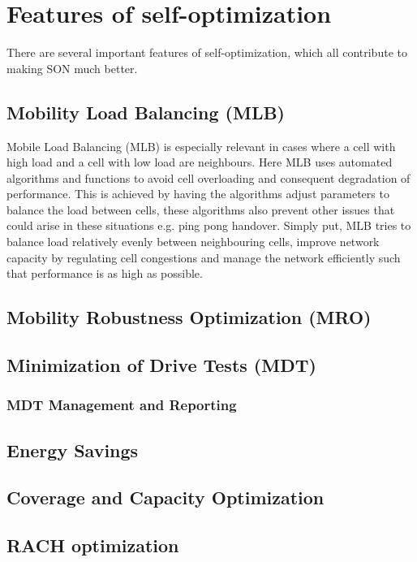 \documentclass{report}
\begin{document}
\section{Features of self-optimization}
There are several important features of self-optimization, which all contribute to making SON much better. 

\subsection{Mobility Load Balancing (MLB)}
Mobile Load Balancing (MLB) is especially relevant in cases where a cell with high load and a cell with low load are neighbours. Here MLB uses automated algorithms and functions to avoid cell overloading and consequent degradation of performance. This is achieved by having the algorithms adjust parameters to balance the load between cells, these algorithms also prevent other issues that could arise in these situations e.g. ping pong handover. 
Simply put, MLB tries to balance load relatively evenly between neighbouring cells, improve network capacity by regulating cell congestions and manage the network efficiently such that performance is as high as possible. 

\subsection{Mobility Robustness Optimization (MRO)}

\subsection{Minimization of Drive Tests (MDT)}

\subsubsection{MDT Management and Reporting}

\subsection{Energy Savings}

\subsection{Coverage and Capacity Optimization}

\subsection{RACH optimization}
\end{document}

